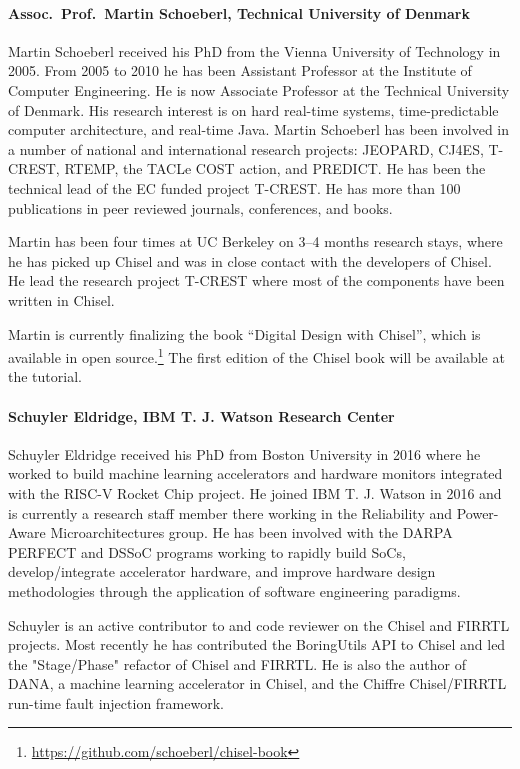 \documentclass{article}
\begin{document}
 
\paragraph{Assoc.~Prof.~Martin Schoeberl, Technical University of Denmark}

Martin Schoeberl received his PhD from the Vienna University of Technology in 2005. From 2005 to 2010 he has been Assistant Professor at the Institute of Computer Engineering. He is now Associate Professor at the Technical University of Denmark. His research interest is on hard real-time systems, time-predictable computer architecture, and real-time Java.  Martin Schoeberl has been involved in a number of national and international research projects: JEOPARD, CJ4ES, T-CREST, RTEMP, the TACLe COST action, and PREDICT.  He has been the technical lead of the EC funded project T-CREST.  He has more than 100 publications in peer reviewed journals, conferences, and books.

Martin has been four times at UC Berkeley on 3--4 months research stays, where he has picked up Chisel and was in close contact with the developers of Chisel. He lead the research project T-CREST where most of the components have been written in Chisel.

Martin is currently finalizing the book ``Digital Design with Chisel'',
which is available in open source.\footnote{\url{https://github.com/schoeberl/chisel-book}}
The first edition of the Chisel book will be available at the tutorial.

\paragraph{Schuyler Eldridge, IBM T. J. Watson Research Center} 

Schuyler Eldridge received his PhD from Boston University in 2016
where he worked to build machine learning accelerators and hardware
monitors integrated with the RISC-V Rocket Chip project. He joined IBM
T. J. Watson in 2016 and is currently a research staff member there
working in the Reliability and Power-Aware Microarchitectures group.
He has been involved with the DARPA PERFECT and DSSoC programs working
to rapidly build SoCs, develop/integrate accelerator hardware, and
improve hardware design methodologies through the application of
software engineering paradigms.

Schuyler is an active contributor to and code reviewer on the Chisel
and FIRRTL projects. Most recently he has contributed the BoringUtils
API to Chisel and led the "Stage/Phase" refactor of Chisel and FIRRTL.
He is also the author of DANA, a machine learning accelerator in
Chisel, and the Chiffre Chisel/FIRRTL run-time fault injection
framework.
\end{document}
